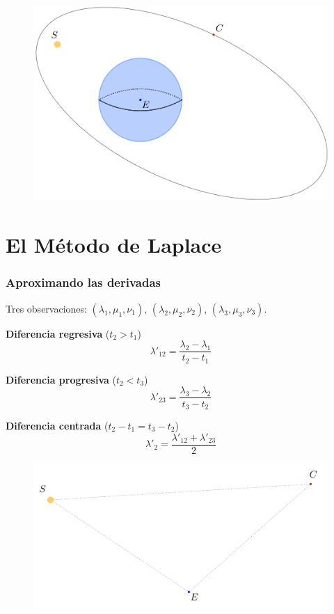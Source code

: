 \documentclass{beamer}
\begin{document}
\begin{frame}
\begin{figure}[H]
\centering
\includegraphics[scale=0.15]{images/problem_construct_3.png}
\end{figure}
\end{frame}


\section{El Método de Laplace}

\begin{frame}
\frametitle{Aproximando las derivadas}
Tres observaciones: $(\lambda_1,\mu_1,\nu_1)$, $(\lambda_2,\mu_2,\nu_2)$, $(\lambda_3,\mu_3,\nu_3)$.\pause
\vspace{0.66666cm}

\textbf{Diferencia regresiva} ($t_2>t_1$)
\[
\lambda'_{12}=\frac{\lambda_2-\lambda_1}{t_2-t_1}
\]

\textbf{Diferencia progresiva} ($t_2<t_3$)
\[
\lambda'_{23}=\frac{\lambda_3-\lambda_2}{t_3-t_2}
\]

\textbf{Diferencia centrada} ($t_2-t_1=t_3-t_2$)
\[
\lambda'_{2}=\frac{\lambda'_{12}+\lambda'_{23}}{2}
\]

\end{frame}

\begin{frame}
\begin{figure}[H]
\centering
\includegraphics[scale=0.2]{images/triangle_tfg.png}
\end{figure}
\end{frame}
\end{document}
